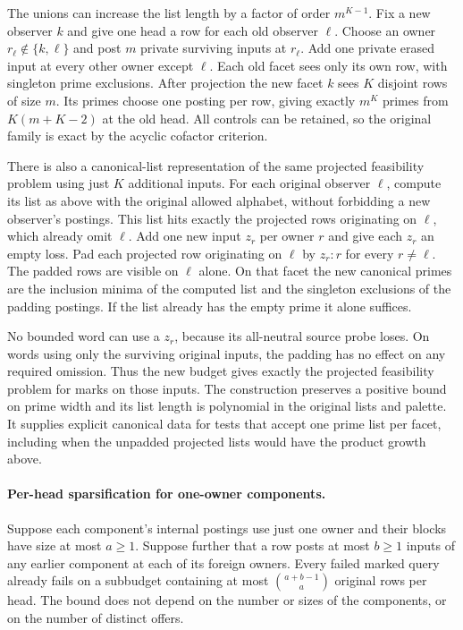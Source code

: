 The unions can increase the list length by a factor
of order $m^{K-1}$. Fix a new observer $k$ and give
one head a row for each old observer $\ell$. Choose
an owner $r_\ell\notin\{k,\ell\}$ and post $m$
private surviving inputs at $r_\ell$. Add one private
erased input at every other owner except $\ell$.
Each old facet sees only its own row, with singleton
prime exclusions. After projection the new facet
$k$ sees $K$ disjoint rows of size $m$. Its primes
choose one posting per row, giving exactly $m^K$
primes from $K(m+K-2)$ at the old head. All controls
can be retained, so the original family is exact by
the acyclic cofactor criterion.

There is also a canonical-list representation of
the same projected feasibility problem using just
$K$ additional inputs. For each original observer
$\ell$, compute its list as above with the
original allowed alphabet, without forbidding a
new observer's postings. This list hits exactly
the projected rows originating on $\ell$, which
already omit $\ell$. Add one new input $z_r$ per
owner $r$ and give each $z_r$ an empty loss.
Pad each projected row originating on $\ell$ by
$z_r:r$ for every $r\ne\ell$. The padded rows are
visible on $\ell$ alone. On that facet the new
canonical primes are the inclusion minima of the
computed list and the singleton exclusions of
the padding postings. If the list already has the
empty prime it alone suffices.

No bounded word can use a $z_r$, because its
all-neutral source probe loses. On words using
only the surviving original inputs, the padding
has no effect on any required omission. Thus the
new budget gives exactly the projected feasibility
problem for marks on those inputs. The construction
preserves a positive bound on prime width and its
list length is polynomial in the original lists
and palette. It supplies explicit canonical data
for tests that accept one prime list per facet,
including when the unpadded projected lists would
have the product growth above.

\paragraph{Per-head sparsification for one-owner components.}
Suppose each component's internal postings use just
one owner and their blocks have size at most $a\ge1$.
Suppose further that a row posts at most $b\ge1$ inputs
of any earlier component at each of its foreign owners.
Every failed marked query already fails on a subbudget
containing at most $\binom{a+b-1}{a}$ original rows per
head. The bound
does not depend on the number or sizes of the
components, or on the number of distinct offers.

